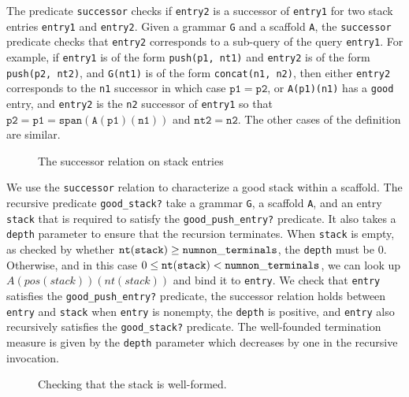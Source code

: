 \documentclass[sigplan,10pt,anonymous,review]{acmart}\settopmatter{printfolios=true,printccs=false,printacmref=false}
\begin{document}
\begin{CCSXML}
The predicate \texttt{successor} checks if \texttt{entry2} is a successor of \texttt{entry1} for two stack entries \texttt{entry1} and \texttt{entry2}\@.
Given a grammar \texttt{G} and a scaffold \texttt{A}, the \texttt{successor} predicate checks that \texttt{entry2} corresponds to a sub-query of the query \texttt{entry1}\@.  For example, if \texttt{entry1} is of the form \texttt{push(p1, nt1)}
and \texttt{entry2} is of the form \texttt{push(p2, nt2)}, and \texttt{G(nt1)}
is of the form \texttt{concat(n1, n2)}, then either \texttt{entry2} corresponds to the \texttt{n1} successor in which case $\mathtt{p1} = \mathtt{p2}$, or \texttt{A(p1)(n1)} has a \texttt{good} entry, and \texttt{entry2} is the \texttt{n2} successor of \texttt{entry1} so that $\mathtt{p2} = \mathtt{p1 = span(A(p1)(n1))}$ and $\mathtt{nt2} = \mathtt{n2}$\@.  The other cases of the definition are similar.  
\begin{figure}[h!]
  
    \vspace*{-4mm}
			\caption{The successor relation on stack entries}
			\label{pvs:successor}
\end{figure}

We use the \texttt{successor} relation to characterize a good stack within
a scaffold.  The recursive predicate \texttt{good\_stack?} take a grammar \texttt{G}, a scaffold \texttt{A}, and an entry \texttt{stack} that is required to
satisfy the \texttt{good\_push\_entry?} predicate.  It also takes a \texttt{depth}
parameter to ensure that the recursion terminates.  When \texttt{stack} is empty,
as checked by whether $\mathtt{nt(stack)} \geq \mathtt{num\-non\_terminals}$,
the \texttt{depth} must be $0$.  Otherwise, and in this case
$0\leq \mathtt{nt(stack)} < \mathtt{num\-non\_terminals}$, we can look up
$A(pos(stack))(nt(stack))$ and bind it to \texttt{entry}\@.  We check that
\texttt{entry} satisfies the \texttt{good\_push\_entry?} predicate,
the successor relation holds between \texttt{entry} and \texttt{stack}
when \texttt{entry} is nonempty, the \texttt{depth} is positive, and
\texttt{entry} also recursively satisfies the \texttt{good\_stack?} predicate.
The well-founded termination measure is given by the \texttt{depth} parameter
which decreases by one in the recursive invocation.  
\begin{figure}[h!]
  
    \vspace*{-4mm}
			\caption{Checking that the stack is well-formed. }
			\label{pvs:goodstack}
\end{figure}


\end{CCSXML}
\end{document}
